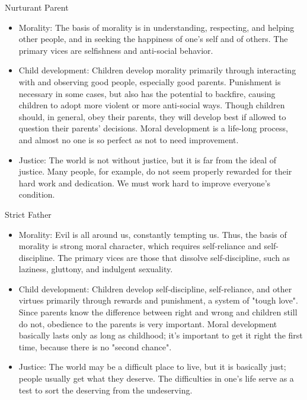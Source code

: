 \begin{frame}{Nurturant Parent}

\begin{itemize}
\item     Morality: The basis of morality is in understanding, respecting, and helping other people, and in seeking the happiness of one's self and of others. The primary vices are selfishness and anti-social behavior.
\item   Child development: Children develop morality primarily through interacting with and observing good people, especially good parents. Punishment is necessary in some cases, but also has the potential to backfire, causing children to adopt more violent or more anti-social ways. Though children should, in general, obey their parents, they will develop best if allowed to question their parents' decisions. Moral development is a life-long process, and almost no one is so perfect as not to need improvement.
\item     Justice: The world is not without justice, but it is far from the ideal of justice. Many people, for example, do not seem properly rewarded for their hard work and dedication. We must work hard to improve everyone's condition.
\end{itemize}

\end{frame}

\begin{frame}{Strict Father}

\begin{itemize}
\item     Morality: Evil is all around us, constantly tempting us. Thus, the basis of morality is strong moral character, which requires self-reliance and self-discipline. The primary vices are those that dissolve self-discipline, such as laziness, gluttony, and indulgent sexuality.
\item     Child development: Children develop self-discipline, self-reliance, and other virtues primarily through rewards and punishment, a system of "tough love". Since parents know the difference between right and wrong and children still do not, obedience to the parents is very important. Moral development basically lasts only as long as childhood; it's important to get it right the first time, because there is no "second chance".
\item 
    Justice: The world may be a difficult place to live, but it is basically just; people usually get what they deserve. The difficulties in one's life serve as a test to sort the deserving from the undeserving.

\end{itemize}
% 
\end{frame}

